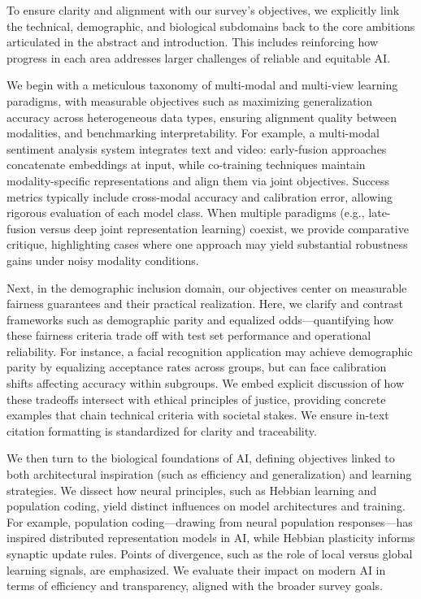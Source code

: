 \documentclass[sigconf]{acmart}
\begin{document}
To ensure clarity and alignment with our survey's objectives, we explicitly link the technical, demographic, and biological subdomains back to the core ambitions articulated in the abstract and introduction. This includes reinforcing how progress in each area addresses larger challenges of reliable and equitable AI.

We begin with a meticulous taxonomy of multi-modal and multi-view learning paradigms, with measurable objectives such as maximizing generalization accuracy across heterogeneous data types, ensuring alignment quality between modalities, and benchmarking interpretability. For example, a multi-modal sentiment analysis system integrates text and video: early-fusion approaches concatenate embeddings at input, while co-training techniques maintain modality-specific representations and align them via joint objectives. Success metrics typically include cross-modal accuracy and calibration error, allowing rigorous evaluation of each model class. When multiple paradigms (e.g., late-fusion versus deep joint representation learning) coexist, we provide comparative critique, highlighting cases where one approach may yield substantial robustness gains under noisy modality conditions.

Next, in the demographic inclusion domain, our objectives center on measurable fairness guarantees and their practical realization. Here, we clarify and contrast frameworks such as demographic parity and equalized odds—quantifying how these fairness criteria trade off with test set performance and operational reliability. For instance, a facial recognition application may achieve demographic parity by equalizing acceptance rates across groups, but can face calibration shifts affecting accuracy within subgroups. We embed explicit discussion of how these tradeoffs intersect with ethical principles of justice, providing concrete examples that chain technical criteria with societal stakes. We ensure in-text citation formatting is standardized for clarity and traceability.

We then turn to the biological foundations of AI, defining objectives linked to both architectural inspiration (such as efficiency and generalization) and learning strategies. We dissect how neural principles, such as Hebbian learning and population coding, yield distinct influences on model architectures and training. For example, population coding—drawing from neural population responses—has inspired distributed representation models in AI, while Hebbian plasticity informs synaptic update rules. Points of divergence, such as the role of local versus global learning signals, are emphasized. We evaluate their impact on modern AI in terms of efficiency and transparency, aligned with the broader survey goals.
\end{document}

